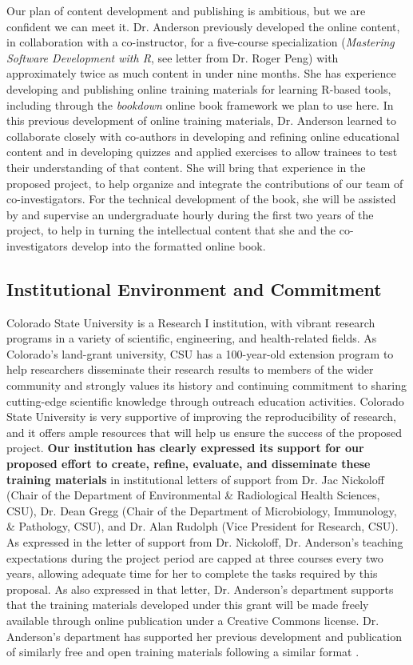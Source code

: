 \documentclass[pdftex,english,11pt,parskip=half]{scrartcl}
\begin{document}
Our plan of content development and publishing is ambitious, but we are
confident we can meet it. Dr. Anderson previously developed the online content,
in collaboration with a co-instructor, for a five-course specialization (\textit{Mastering Software Development with R}, see letter from Dr. Roger Peng) with
approximately twice as much content in under nine months. She has experience
developing and publishing online training materials for learning R-based tools,
including through the \textit{bookdown} online book framework we plan to use
here. In this previous development of online training materials, Dr. Anderson
learned to collaborate closely with co-authors in developing and refining online educational
content and in developing quizzes and applied exercises to allow trainees to
test their understanding of that content. She will bring that experience in the
proposed project, to help organize and integrate the contributions of our team
of co-investigators. For the technical development of the book, she will be
assisted by and supervise an undergraduate hourly during the first two years of
the project, to help in turning the intellectual content that she and the
co-investigators develop into the formatted online book. 

\subsection{Institutional Environment and Commitment}

Colorado State University is a Research I institution, with vibrant research programs in a variety of scientific, engineering, and health-related fields. As Colorado's land-grant university, CSU has a 100-year-old extension program to help researchers disseminate their research results to members of the wider community and strongly values its history and continuing commitment to sharing cutting-edge scientific knowledge through outreach education activities. Colorado State University is very supportive of improving the reproducibility of
research, and it offers ample resources that will help us ensure the success of
the proposed project. \textbf{Our institution has clearly expressed its support
for our proposed effort to create, refine, evaluate, and disseminate these
training materials} in institutional letters of support from Dr. Jac Nickoloff
(Chair of the Department of Environmental \& Radiological Health Sciences, CSU),
Dr. Dean Gregg (Chair of the Department of Microbiology, Immunology, \&
Pathology, CSU), and Dr. Alan Rudolph (Vice President for Research, CSU). As
expressed in the letter of support from Dr. Nickoloff, Dr. Anderson's teaching
expectations during the project period are capped at three courses every two
years, allowing adequate time for her to complete the tasks required by this
proposal. As also expressed in that letter, Dr. Anderson's department supports
that the training materials developed under this grant will be made freely
available through online publication under a Creative Commons license. Dr.
Anderson's department has supported her previous development and publication of
similarly free and open training materials following a similar format \cite{andersoncoursebook, andersonmastering}.
\end{document}
